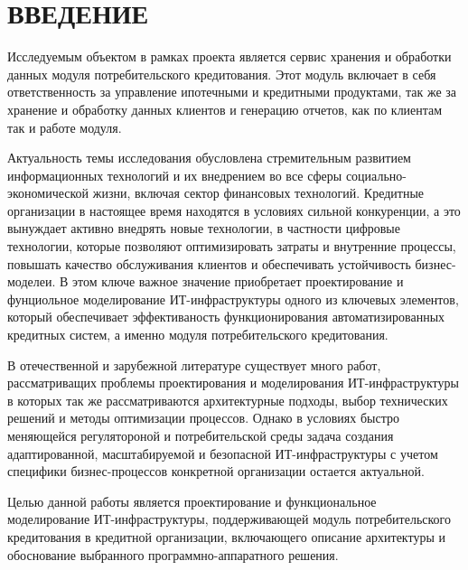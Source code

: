 \documentclass[14pt, a4paper]{extarticle}
\begin{document}
\def\contentsname{СОДЕРЖАНИЕ}

%   
%   

\setcounter{page}{1}
\tableofcontents

\section*{ВВЕДЕНИЕ}
{}

Исследуемым объектом в рамках проекта является сервис хранения и обработки
данных модуля потребительского кредитования. Этот модуль включает в
себя ответственность за управление ипотечными и кредитными продуктами, так же
за хранение и обработку данных клиентов и генерацию отчетов, как по клиентам
так и работе модуля.

Актуальность темы исследования обусловлена стремительным развитием информационных
технологий и их внедрением во все сферы социально-экономической жизни, включая сектор
финансовых технологий. Кредитные организации в настоящее время находятся в условиях
сильной конкуренции, а это вынуждает активно внедрять новые технологии, в частности
цифровые технологии, которые позволяют оптимизировать затраты и внутренние процессы,
повышать качество обслуживания клиентов и обеспечивать устойчивость бизнес-моделеи.
В этом ключе важное значение приобретает проектирование и фунциольное моделирование
ИТ-инфраструктуры одного из ключевых элементов, который обеспечивает эффективаность
функционирования автоматизированных кредитных систем, а именно модуля потребительского
кредитования.

В отечественной и зарубежной литературе существует много работ, рассматриващих
проблемы проектирования и моделирования ИТ-инфраструктуры в которых так же
рассматриваются архитектурные подходы, выбор технических решений и методы оптимизации
процессов. Однако в условиях быстро меняющейся регулятороной и потребительской среды
задача создания адаптированной, масштабируемой и безопасной ИТ-инфраструктуры с учетом
специфики бизнес-процессов конкретной организации остается актуальной.

Целью данной работы является проектирование и функциональное моделирование
ИТ-инфраструктуры, поддерживающей модуль потребительского кредитования в
кредитной организации, включающего описание архитектуры и обоснование выбранного
программно-аппаратного решения.
\end{document}
